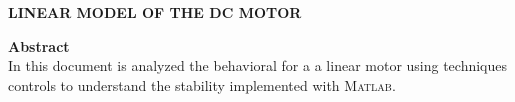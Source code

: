 \documentclass[12pt]{article}
\newcommand{\Matlab}{\textsc{Matlab}}
\begin{document}
\makeatletter 
\newlength{\figrulesep} 
\setlength{\figrulesep}{0.5\textfloatsep} 

\newcommand{\topfigrule}{\vspace*{-1pt}%
\noindent{\color{cream}\rule[-\figrulesep]{\columnwidth}{1.5pt}} }

\newcommand{\botfigrule}{\vspace*{-2pt}%
\noindent{\color{cream}\rule[\figrulesep]{\columnwidth}{1.5pt}} }

\newcommand{\dblfigrule}{\vspace*{-1pt}%
\noindent{\color{cream}\rule[-\figrulesep]{\textwidth}{1.5pt}} }

\makeatother

\vspace{3cm}
\sffamily
\begin{center}
\LARGE{\textbf{LINEAR MODEL OF THE DC MOTOR}} \\%
\end{center}

\normalsize{\textbf{Abstract}\\
In this document is analyzed the behavioral for a a linear motor using techniques controls to understand the stability implemented with \Matlab. } \\%



\renewcommand*\rmdefault{bch}\normalfont\upshape
\rmfamily
\section*{}
\vspace{-1cm}



\end{document}
